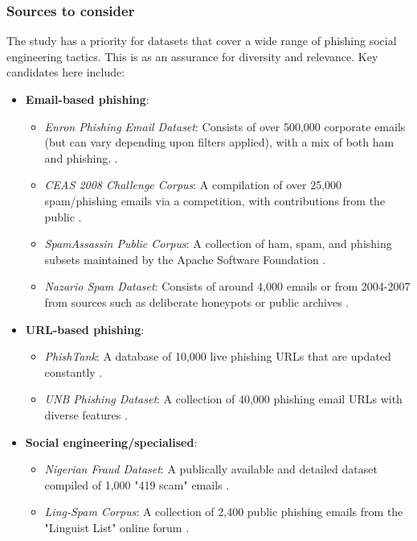
\subsubsection*{Sources to consider}
The study has a priority for datasets that cover a wide range of phishing social engineering tactics. This is as an assurance for diversity and relevance. Key candidates here include:

\begin{itemize}
  \item \textbf{Email-based phishing}:
  \begin{itemize}
    \item \textit{Enron Phishing Email Dataset}: Consists of over 500,000 corporate emails (but can vary depending upon filters applied), with a mix of both ham and phishing. \citep{klimt2004enron}.
    \item \textit{CEAS 2008 Challenge Corpus}: A compilation of over 25,000 spam/phishing emails via a competition, with contributions from the public \citep{cormack2008email}.
    \item \textit{SpamAssassin Public Corpus}: A collection of ham, spam, and phishing subsets maintained by the Apache Software Foundation \citep{spamassassin2003}.
    \item \textit{Nazario Spam Dataset}: Consists of around 4,000 emails or from 2004-2007 from sources such as deliberate honeypots or public archives \citep{nazario2007phishing}.
  \end{itemize}
\item \textbf{URL-based phishing}:
\begin{itemize}
  \item \textit{PhishTank}: A database of 10,000 live phishing URLs that are updated constantly \citep{phishTank2023}.
  \item \textit{UNB Phishing Dataset}: A collection of 40,000 phishing email URLs with diverse features \citep{unb2016phishing}.
\end{itemize}
\item \textbf{Social engineering/specialised}:
  \begin{itemize}
    \item \textit{Nigerian Fraud Dataset}: A publically available and detailed dataset compiled of 1,000 "419 scam" emails \citep{champa2024phishing}.
    \item \textit{Ling-Spam Corpus}: A collection of 2,400 public phishing emails from the "Linguist List" online forum \citep{ling2005spam}.
  \end{itemize}
\end{itemize}
